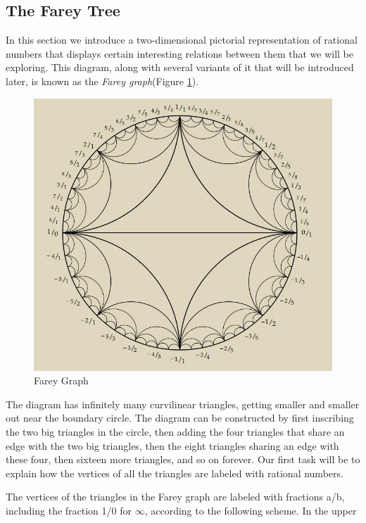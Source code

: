 \subsection{The Farey Tree}
\label{chap4.1}
In this section we introduce a two-dimensional pictorial representation of rational numbers that displays certain interesting relations between
them that we will be exploring. This diagram, along with several variants of it that
will be introduced later, is known as the \textit{Farey graph}(Figure \ref{FareyDiagram}).
\begin{figure}
    \centering
    \includegraphics[scale=0.5]{FareyDiagram.jpg}
    \caption{Farey Graph}
    \label{FareyDiagram}
\end{figure}
\par
The diagram has infinitely many curvilinear triangles, getting smaller and smaller out near the boundary circle. The diagram can be constructed by first inscribing the two big
triangles in the circle, then adding the four triangles that share an edge with the two
big triangles, then the eight triangles sharing an edge with these four, then sixteen
more triangles, and so on forever. Our first task will be to explain how the vertices of all the
triangles are labeled with rational numbers.
\par
The vertices of the triangles in the Farey graph are labeled with fractions a/b,
including the fraction 1/0 for $\infty$, according to the following scheme. In the upper
